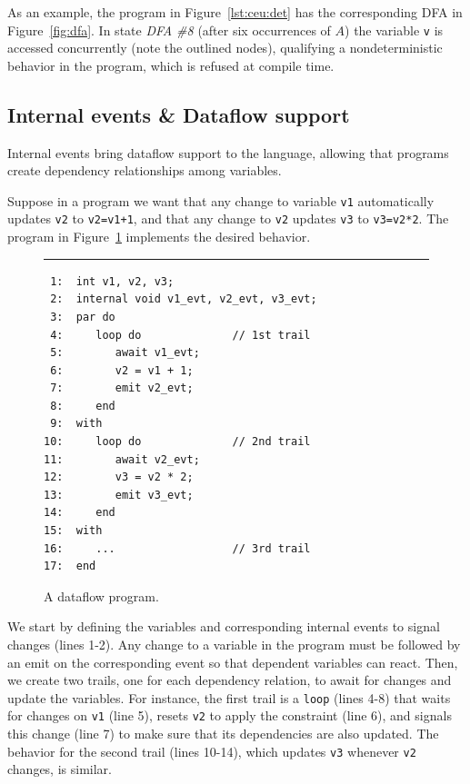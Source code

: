 \documentclass[pdftex,12pt,a4paper]{article}
\newcommand{\code}[1] {{\small{\texttt{#1}}}}
\begin{document}
As an example, the program in Figure~\ref{lst:ceu:det} has the corresponding 
DFA in Figure~\ref{fig:dfa}.
In state \emph{DFA \#8} (after six occurrences of $A$) the variable \code{v} is 
accessed concurrently (note the outlined nodes), qualifying a nondeterministic 
behavior in the program, which is refused at compile time.

\subsection{Internal events \& Dataflow support}
\label{sec:ceu:frp}

Internal events bring dataflow support to the language, allowing that programs 
create dependency relationships among variables.

Suppose in a program we want that any change to variable \code{v1} 
automatically updates \code{v2} to \code{v2=v1+1}, and that any change to 
\code{v2} updates \code{v3} to \code{v3=v2*2}.
The program in Figure~\ref{lst:ceu:frp:1} implements the desired behavior.


\begin{figure}[t]
\rule{8.5cm}{0.37pt}
{\small
\begin{verbatim}
 1:  int v1, v2, v3;
 2:  internal void v1_evt, v2_evt, v3_evt;
 3:  par do
 4:     loop do              // 1st trail
 5:        await v1_evt;
 6:        v2 = v1 + 1;
 7:        emit v2_evt;
 8:     end
 9:  with
10:     loop do              // 2nd trail
11:        await v2_evt;
12:        v3 = v2 * 2;
13:        emit v3_evt;
14:     end
15:  with
16:     ...                  // 3rd trail
17:  end
\end{verbatim}
}
\caption{ A dataflow program.
\label{lst:ceu:frp:1}
}
\end{figure}

We start by defining the variables and corresponding internal events to signal 
changes (lines 1-2).
Any change to a variable in the program must be followed by an emit on the 
corresponding event so that dependent variables can react.
Then, we create two trails, one for each dependency relation, to await for 
changes and update the variables.
For instance, the first trail is a \code{loop} (lines 4-8) that waits for 
changes on \code{v1} (line 5), resets \code{v2} to apply the constraint (line 
6), and signals this change (line 7) to make sure that its dependencies are 
also updated.
The behavior for the second trail (lines 10-14), which updates \code{v3} 
whenever \code{v2} changes, is similar.
\end{document}
